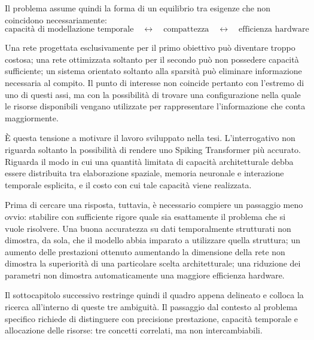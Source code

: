Il problema assume quindi la forma di un equilibrio tra esigenze che non coincidono necessariamente:
\begin{equation}
\label{eq:tradeoff_principale}
\boxed{\text{capacità di modellazione temporale} \quad \longleftrightarrow \quad \text{compattezza} \quad \longleftrightarrow \quad \text{efficienza hardware}}
\end{equation}

Una rete progettata esclusivamente per il primo obiettivo può diventare troppo costosa; una rete ottimizzata soltanto per il secondo può non possedere capacità sufficiente; un sistema orientato soltanto alla sparsità può eliminare informazione necessaria al compito. Il punto di interesse non coincide pertanto con l'estremo di uno di questi assi, ma con la possibilità di trovare una configurazione nella quale le risorse disponibili vengano utilizzate per rappresentare l'informazione che conta maggiormente.

È questa tensione a motivare il lavoro sviluppato nella tesi. L'interrogativo non riguarda soltanto la possibilità di rendere uno Spiking Transformer più accurato. Riguarda il modo in cui una quantità limitata di capacità architetturale debba essere distribuita tra elaborazione spaziale, memoria neuronale e interazione temporale esplicita, e il costo con cui tale capacità viene realizzata.

Prima di cercare una risposta, tuttavia, è necessario compiere un passaggio meno ovvio: stabilire con sufficiente rigore quale sia esattamente il problema che si vuole risolvere. Una buona accuratezza su dati temporalmente strutturati non dimostra, da sola, che il modello abbia imparato a utilizzare quella struttura; un aumento delle prestazioni ottenuto aumentando la dimensione della rete non dimostra la superiorità di una particolare scelta architetturale; una riduzione dei parametri non dimostra automaticamente una maggiore efficienza hardware.

Il sottocapitolo successivo restringe quindi il quadro appena delineato e colloca la ricerca all'interno di queste tre ambiguità. Il passaggio dal contesto al problema specifico richiede di distinguere con precisione prestazione, capacità temporale e allocazione delle risorse: tre concetti correlati, ma non intercambiabili.




